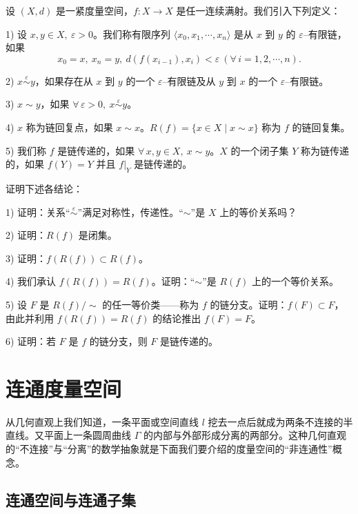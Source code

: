 \begin{exercise}
	\item 设 $(X,d)$ 是一紧度量空间，$f:X\to X$ 是任一连续满射。我们引入下列定义：

	1) 设 $x,y\in X,\ \varepsilon>0$。我们称有限序列 $\langle x_0,x_1,\cdots,x_n\rangle$ 是从 $x$ 到 $y$ 的 $\varepsilon$--有限链，如果
	\[x_0=x,\ x_n=y,\ d(f(x_{i-1}),x_i)<\varepsilon\ (\forall\,i=1,2,\cdots,n).\]

	2) $x\stackrel{\varepsilon}{\sim}y$，如果存在从 $x$ 到 $y$ 的一个 $\varepsilon$--有限链及从 $y$ 到 $x$ 的一个 $\varepsilon$--有限链。

	3) $x\sim y$，如果 $\forall\,\varepsilon>0,\ x\stackrel{\varepsilon}{\sim}y$。

	4) $x$ 称为链回复点，如果 $x\sim x$。$R(f)=\{x\in X\mid x\sim x\}$ 称为 $f$ 的链回复集。

	5) 我们称 $f$ 是链传递的，如果 $\forall\,x,y\in X,\ x\sim y$。$X$ 的一个闭子集 $Y$ 称为链传递的，如果 $f(Y)=Y$ 并且 $f|_Y$ 是链传递的。

	证明下述各结论：

	1) 证明：关系“$\stackrel{\varepsilon}{\sim}$”满足对称性，传递性。“$\sim$”是 $X$ 上的等价关系吗？

	2) 证明：$R(f)$ 是闭集。

	3) 证明：$f(R(f))\subset R(f)$。

	4) 我们承认 $f(R(f))=R(f)$。证明：“$\sim$”是 $R(f)$ 上的一个等价关系。

	5) 设 $F$ 是 $R(f)/\!\!\sim$ 的任一等价类——称为 $f$ 的链分支。证明：$f(F)\subset F$，由此并利用 $f(R(f))=R(f)$ 的结论推出 $f(F)=F$。

	6) 证明：若 $F$ 是 $f$ 的链分支，则 $F$ 是链传递的。
\end{exercise}

\section{连通度量空间}

从几何直观上我们知道，一条平面或空间直线 $l$ 挖去一点后就成为两条不连接的半直线。又平面上一条圆周曲线 $\Gamma$ 的内部与外部形成分离的两部分。这种几何直观的“不连接”与“分离”的数学抽象就是下面我们要介绍的度量空间的“非连通性”概念。

\subsection{连通空间与连通子集}
	\label{sec:10-6-1}

